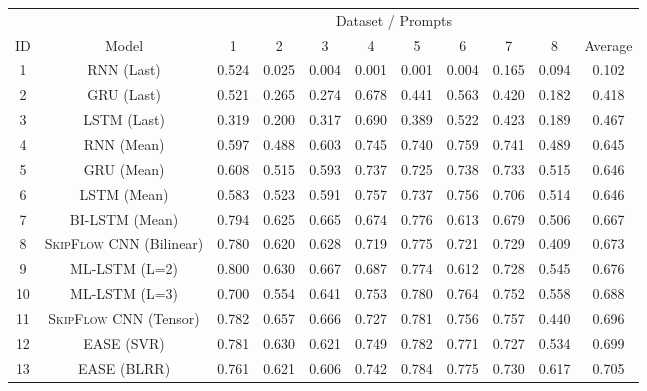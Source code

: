 \documentclass[letterpaper]{article}
\begin{document}
\begin{table*}[ht]
   \centering
   \small
   \setlength{\extrarowheight}{1.2pt}
     \begin{tabular}{|c|c|cccccccc|c|}
     \hline

           & & \multicolumn{8}{c}{Dataset / Prompts}                       &  \\
           \cline{1-11}
     ID & Model & 1     & 2     & 3     & 4     & 5     & 6     & 7     & 8     & Average \\
     \hline
    
     1 & RNN (Last) & 0.524 & 0.025 & 0.004 & 0.001 & 0.001 & 0.004 & 0.165 & 0.094 & 0.102 \\
     2 & GRU (Last) & 0.521 & 0.265 & 0.274 & 0.678 & 0.441 & 0.563 & 0.420 & 0.182 & 0.418 \\
     3 & LSTM (Last) & 0.319 & 0.200   & 0.317 & 0.690  & 0.389 & 0.522 & 0.423 & 0.189 & 0.467 \\


     4 & RNN (Mean) & 0.597  &  0.488 &  0.603 &  0.745 &  0.740 &   0.759 &  0.741  & 0.489  & 0.645 \\
     5 & GRU (Mean) & 0.608 & 0.515 & 0.593 & 0.737 & 0.725 & 0.738 & 0.733 & 0.515 & 0.646 \\
     6 & LSTM (Mean) & 0.583 & 0.523 & 0.591 & 0.757 & 0.737 & 0.756 & 0.706 & 0.514 & 0.646 \\
     

     7 & BI-LSTM (Mean) & 0.794  & 0.625  & 0.665 &  0.674 &  0.776 &  0.613 &  0.679 &  0.506 &  0.667   \\
8 & \textsc{SkipFlow} CNN (Bilinear) & 0.780  &  0.620 &   0.628 &  0.719  & 0.775 &  0.721 &  0.729  & 0.409 &  0.673 \\
     9 &  ML-LSTM (L=2) & 0.800  &  0.630 &   0.667  & 0.687 &   0.774 &  0.612 &  0.728 &  0.545  & 0.676 \\
    10 &  ML-LSTM (L=3) & 0.700  &  0.554  & 0.641  & 0.753  &  0.780 &   0.764 &   0.752 &  0.558 &  0.688  \\   

     
     11 &  \textsc{SkipFlow} CNN (Tensor) &  0.782  &  0.657 &   0.666 &   0.727 &   0.781  &  0.756  &  0.757 &   0.440  &   0.696 \\
     12 & EASE (SVR) & 0.781 & 0.630  & 0.621 & 0.749 & 0.782 & 0.771 & 0.727 & 0.534 & 0.699 \\
     13 & EASE (BLRR) & 0.761 & 0.621 & 0.606 & 0.742 & 0.784 & 0.775 & 0.730  & 0.617 & 0.705 \\


\end{tabular}
\end{table*}
\end{document}

